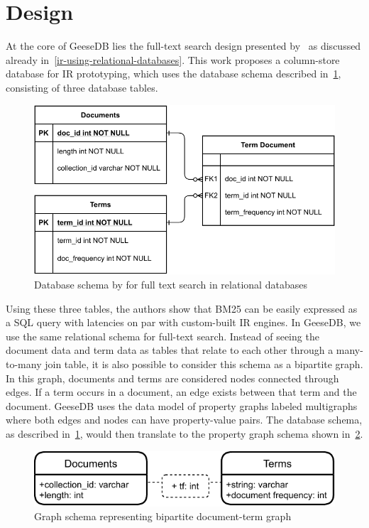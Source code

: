 \section{Design}
At the core of GeeseDB lies the full-text search design presented by~\citet{OldDog} as discussed already in~\cref{ir-using-relational-databases}. This work proposes a column-store database for IR prototyping, which uses the database schema described in~\cref{olddog_schema}, consisting of three database tables.
\begin{figure}
	\centering
	\includegraphics[width=\linewidth]{./imgs/olddog-schema-2.pdf}
	\caption{Database schema by \citeauthor{OldDog} for full text search in relational databases}
	\label{olddog_schema}
\end{figure}
Using these three tables, the authors show that BM25 can be easily expressed as a SQL query with latencies on par with custom-built IR engines. In GeeseDB, we use the same relational schema for full-text search.
Instead of seeing the document data and term data as tables that relate to each other through a many-to-many join table, it is also possible to consider this schema as a bipartite graph. In this graph, documents and terms are considered nodes connected through edges. If a term occurs in a document, an edge exists between that term and the document. GeeseDB uses the data model of property graphs labeled multigraphs where both edges and nodes can have property-value pairs. The database schema, as described in~\cref{olddog_schema}, would then translate to the property graph schema shown in~\cref{olddog-graph-schema}.
\begin{figure}
	\centering
	\includegraphics[width=\linewidth]{./imgs/olddog-graph-schema.pdf}
	\caption{Graph schema representing bipartite document-term graph}
	\label{olddog-graph-schema}
\end{figure}
